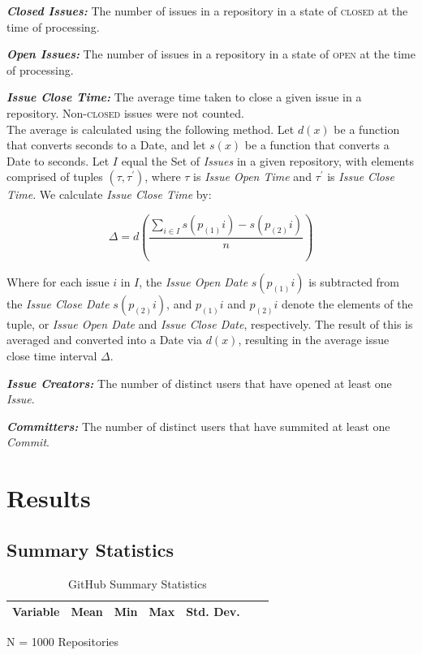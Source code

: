 \documentclass{proc}
\begin{document}
{{{{{{{\noindent \textbf{\textit{Closed Issues:}}
The number of issues in a repository in a state of \textsc{closed} at the time of processing.

\noindent \textbf{\textit{Open Issues:}}
The number of issues in a repository in a state of \textsc{open} at the time of processing.

\noindent \textbf{\textit{Issue Close Time:}}
The average time taken to close a given issue in a repository. Non-\textsc{closed} issues were not counted.\\

The average is calculated using the following method. Let $d(x)$ be a function that converts seconds to a Date, and let $s(x)$ be a function that converts a Date to seconds. Let $I$ equal the Set of \textit{Issues} in a given repository, with elements comprised of tuples $(\tau, \tau^\prime)$, where $\tau$ is \textit{Issue Open Time} and $\tau^\prime$ is \textit{Issue Close Time}. We calculate \textit{Issue Close Time} by: 

\[ \Delta = d\left( \frac{\sum_{i \in I} s( p_{(1)}i ) - s( p_{(2)}i )  } {n} \right) \]

Where for each issue $i$ in $I$, the \textit{Issue Open Date} $s( p_{(1)}i)$ is subtracted from the \textit{Issue Close Date} $s( p_{(2)}i)$, and $p_{(1)}i$ and $p_{(2)}i$ denote the elements of the tuple, or \textit{Issue Open Date} and \textit{Issue Close Date}, respectively. The result of this is averaged and converted into a Date via $d(x)$, resulting in the average issue close time interval $\Delta$.

\noindent \textbf{\textit{Issue Creators:}}
The number of distinct users that have opened at least one \textit{Issue}.

\noindent \textbf{\textit{Committers:}}
The number of distinct users that have summited at least one \textit{Commit}.

\section{Results}

\subsection{Summary Statistics}
\begin{table}[!ht]
\begin{center}
\begin{tabular}{rrrrrrr}
\hline
Variable & Mean & Min & Max & Std. Dev. \\
\hline

\hline
\end{tabular}
N = 1000 Repositories
\caption{GitHub Summary Statistics}
\label{table:summary_stats}
\end{center}
\end{table}

}}}}}}}
\end{document}

